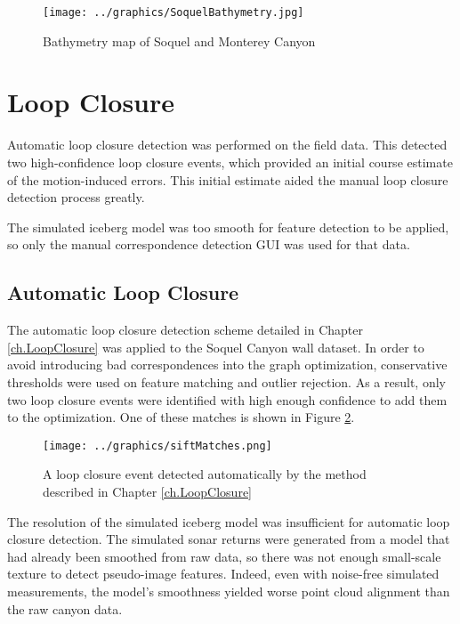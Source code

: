  \begin{figure}[!htb]
   \centering
   \texttt{[image: ../graphics/SoquelBathymetry.jpg]} %
   \caption{Bathymetry map of Soquel and Monterey Canyon}
   \label{fig:SoquelBathy}
\end{figure}

\section{Loop Closure}

Automatic loop closure detection was performed on the field data. This detected two high-confidence loop closure events, which provided an initial course estimate of the motion-induced errors. This initial estimate aided the manual loop closure detection process greatly.

The simulated iceberg model was too smooth for feature detection to be applied, so only the manual correspondence detection GUI was used for that data. 
\subsection{Automatic Loop Closure}

The automatic loop closure detection scheme detailed in Chapter \ref{ch.LoopClosure} was applied to the Soquel Canyon wall dataset. In order to avoid introducing bad correspondences into the graph optimization, conservative thresholds were used on feature matching and outlier rejection. As a result, only two loop closure events were identified with high enough confidence to add them to the optimization. One of these matches is shown in Figure \ref{fig:autoLC}.

 \begin{figure}[!htb]
   \centering
   \texttt{[image: ../graphics/siftMatches.png]} %
   \caption{A loop closure event detected automatically by the method described in Chapter \ref{ch.LoopClosure}}
   \label{fig:autoLC}
\end{figure}

The resolution of the simulated iceberg model was insufficient for automatic loop closure detection. The simulated sonar returns were generated from a model that had already been smoothed from raw data, so there was not enough small-scale texture to detect pseudo-image features. Indeed, even with noise-free simulated measurements, the model's smoothness yielded worse point cloud alignment than the raw canyon data.

